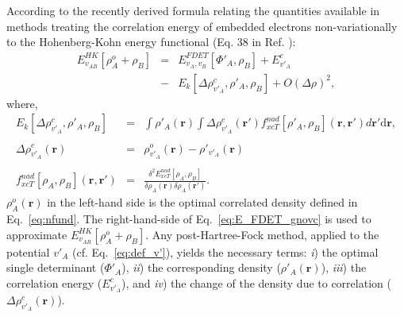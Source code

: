 \documentclass[journal=jctcce,manuscript=article]{achemso}
\newcommand{\nr}[1]{\color{red}#1\color{black}}
\begin{document}
According to the recently derived formula relating the quantities available in methods treating the correlation energy of embedded electrons non-variationally to the Hohenberg-Kohn energy functional (Eq. 38 in Ref. ): 
\begin{eqnarray} \label{eq:E_FDET_gnovc}
 E_{v_{AB}}^{HK}[\rho_A^{o}+\rho_B] &=& E_{v_{A},{v_B}}^{FDET}[\Phi'_{A},\rho_B] + E^{c}_{v'_A} 
 \\ \nonumber
 &-& E_k[\Delta \rho^{c}_{v'_A}, \rho'_A, \rho_B] + O(\Delta\rho)^2, %
 \end{eqnarray}
where,
\begin{eqnarray}
\label{eq:nkernel}
 E_k[\Delta \rho^{c}_{v'_A}, \rho'_A, \rho_B] &=&
  \int \rho'_A(\mathbf{r})  \int \Delta \rho^{c}_{v'_A}(\mathbf{r'}) f^{nad}_{xcT}[\rho'_A, \rho_B](\mathbf{r},\mathbf{r'})d\mathbf{r'}\mathrm{d}\mathbf{r},\\
  \nonumber \\ \label{eq:def_corrdens}
  \Delta \rho^{c}_{v'_A}(\mathbf{r})&=&\rho^{o}_{v'_A}(\mathbf{r})-\rho'_{v'_A}(\mathbf{r})\\
  \nonumber \\
 \label{eq:nf_nad}
 f^{nad}_{xcT}[\rho_A, \rho_B](\mathbf{r},\mathbf{r'}) &=& \frac{\delta^2 E^{nad}_{xcT}[\rho_A, \rho_B]}{\delta \rho_A(\mathbf{r}) \delta \rho_A(\mathbf{r'})}.
\end{eqnarray}
$\rho_A^{o}(\mathbf{r})$ in the left-hand side is the optimal correlated density
defined in Eq.~\ref{eq:nfund}. 
The right-hand-side of Eq.~\ref{eq:E_FDET_gnovc} is used to approximate $E_{v_{AB}}^{HK}[\rho_A^{o}+\rho_B]$.
\nr{Any post-Hartree-Fock method, applied to the potential $v'_A$ (cf. Eq.~\ref{eq:def_v'}), yields the necessary terms: {\it i})
the optimal single determinant ($\Phi'_{A}$), {\it ii}) the corresponding density ($\rho'_{A}(\mathbf{r})$), 
{\it iii}) the correlation energy ($E^{c}_{v'_A}$), and {\it iv}) the change of the density due to correlation ($\Delta \rho^{c}_{v'_A}(\mathbf{r})$).}
\end{document}
